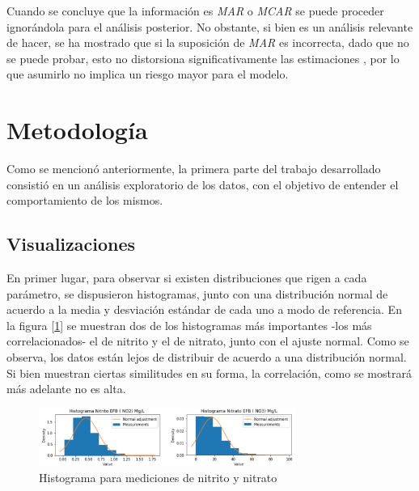 \documentclass[letterpaper, 12pt]{article}
\begin{document}
Cuando se concluye que la información es \textit{MAR} o \textit{MCAR} se puede proceder ignorándola para el análisis posterior. No obstante, si bien es un análisis relevante de hacer, se ha mostrado que si la suposición de \textit{MAR} es incorrecta, dado que no se puede probar, esto no distorsiona significativamente las estimaciones \cite{mcnar}, por lo que asumirlo no implica un riesgo mayor para el modelo.



\section{Metodología}

Como se mencionó anteriormente, la primera parte del trabajo desarrollado consistió en un análisis exploratorio de los datos, con el objetivo de entender el comportamiento de los mismos.

\subsection{Visualizaciones}

En primer lugar, para observar si existen distribuciones que rigen a cada parámetro, se dispusieron histogramas, junto con una distribución normal de acuerdo a la media y desviación estándar de cada uno a modo de referencia. En la figura [\ref{fig:histograms1}] se muestran dos de los histogramas más importantes -los más correlacionados- el de nitrito y el de nitrato, junto con el ajuste normal. Como se observa, los datos están lejos de distribuir de acuerdo a una distribución normal. Si bien muestran ciertas similitudes en su forma, la correlación, como se mostrará más adelante no es alta.\\

\begin{figure}
  \centering
    \includegraphics[width=0.75\textwidth]{img/histograms1.png}
  \caption{Histograma para mediciones de nitrito y nitrato}
  \label{fig:histograms1}
\end{figure}
\end{document}
